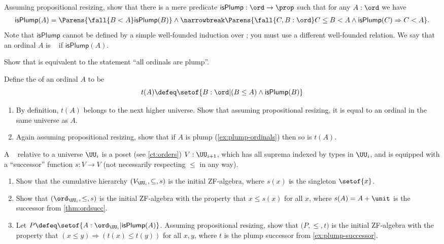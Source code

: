 \begin{ex}\label{ex:plump-ordinals}
  Assuming propositional resizing, show that there is a mere predicate $\mathsf{isPlump}:\ord\to\prop$ such that for any $A:\ord$ we have
  \begin{multline*}\label{eq:plump}
    \mathsf{isPlump}(A) = \Parens{\fall{B<A} \mathsf{isPlump}(B)} \wedge\narrowbreak
    \Parens{\fall{C,B:\ord} C\le B < A \wedge \mathsf{isPlump}(C) \Rightarrow C < A}.
  \end{multline*}
  Note that $\mathsf{isPlump}$ cannot be defined by a simple well-founded induction over \ord; you must use a different well-founded relation.
  We say that an ordinal $A$ is ~\cite{taylor:ordinals,Taylor99} if $\mathsf{isPlump}(A)$.
\end{ex}

\begin{ex}\label{ex:not-plump}
  Show that \LEM{} is equivalent to the statement ``all ordinals are plump''.
\end{ex}

\begin{ex}\label{ex:plump-successor}
  Define the  of an ordinal $A$ to be
  \[ t(A) \defeq \setof{ B:\ord | (B\le A) \wedge \mathsf{isPlump}(B) } \]
  \begin{enumerate}
  \item By definition, $t(A)$ belongs to the next higher universe.
    Show that assuming propositional resizing, it is equal to an ordinal in the same universe as $A$.
  \item Again assuming propositional resizing, show that if $A$ is plump (\cref{ex:plump-ordinals}) then so is $t(A)$.
  \end{enumerate}
\end{ex}

\begin{ex}\label{ex:ZF-algebras}
  A ~\cite{JoyalMoerdijk1995}
  relative to a universe $\UU_i$ is a poset (see \cref{ct:orders}) $V:\UU_{i+1}$, which has all suprema indexed by types in $\UU_i$, and is equipped with a ``successor'' function $s:V\to V$ (not necessarily respecting $\le$ in any way).
  \begin{enumerate}
  \item Show that the cumulative hierarchy $(V_{\UU_i},\subseteq,s)$ is the initial ZF-algebra, where $s(x)$ is the singleton $\setof{x}$.
  \item Show that $(\ord_{\UU_i},\le,s)$ is the initial ZF-algebra with the property that $x\le s(x)$ for all $x$, where $s(A)=A+\unit$ is the successor from \cref{thm:ordsucc}.
  \item Let $P \defeq \setof{A:\ord_{\UU_i} | \mathsf{isPlump}(A) }$. Assuming propositional resizing, show that 
  $\bigl(P,\le,t\bigr)$ is 
  the initial ZF-algebra with the property that $(x\le y) \Rightarrow (t(x)\le t(y))$ for all $x,y$, where $t$ is the plump successor from \cref{ex:plump-successor}.
  \end{enumerate}
\end{ex}


